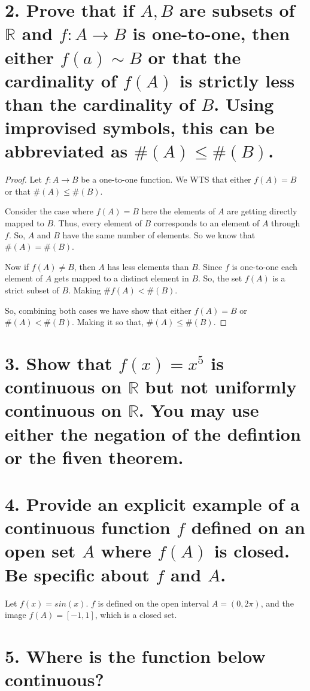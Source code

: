 \documentclass{article}
\begin{document}
\section*{2. Prove that if $A,B$ are subsets of $\mathbb{R}$ and $f : A \to B$ is one-to-one, then either
$f(a) \sim B$ or that the cardinality of $f(A)$ is strictly less than the cardinality of $B$. Using improvised symbols, this can be abbreviated 
as $\#(A) \le \#(B)$.}

\begin{proof}
Let $f: A \to B$ be a one-to-one function. We WTS that either $f(A) = B$ or that $\#(A) \le \#(B)$.

Consider the case where $f(A) = B$ here the elements of $A$ are getting directly mapped to $B$. Thus, 
every element of $B$ corresponds to an element of $A$ through $f$. So, $A$ and $B$ have the same number of elements. 
So we know that $\#(A) = \#(B)$.

Now if $f(A) \ne B$, then $A$ has less elements than $B$. Since $f$ is one-to-one each element of $A$ gets mapped to a 
distinct element in $B$. So, the set $f(A)$ is a strict subset of $B$. Making $\#f(A) < \#(B)$.

So, combining both cases we have show that either $f(A) = B$ or $\#(A) < \#(B)$. Making it so that,
$\#(A) \le \#(B)$.
\end{proof}

\section*{3. Show that $f(x) = x^5$ is continuous on $\mathbb{R}$ but not uniformly continuous on $\mathbb{R}$. You may use either the negation of the defintion or the fiven theorem.}
\subsection*{}

\section*{4. Provide an explicit example of a continuous function $f$ defined on an open set $A$ where $f(A)$ is closed. Be specific about $f$ and $A$.}

Let $f(x) = sin(x)$. $f$ is defined on the open interval $A = (0, 2\pi)$, and the image $f(A) = [-1,1]$, which is a closed set.

\section*{5. Where is the function below continuous?}
\end{document}
